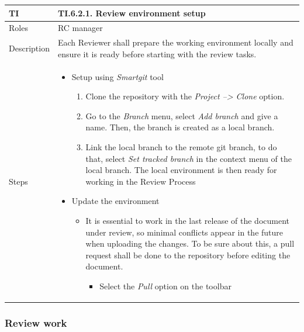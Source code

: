 \documentclass{template/openetcs_article}
\begin{document}
\begin{flushleft}
\tablefirsthead{}
\tablehead{}
\tabletail{}
\tablelasttail{}
\begin{supertabular}{|m{2cm}|m{13cm}|}
\hline
{}
TI & 
TI.6.2.1. Review environment setup
\\\hline
Roles &
RC manager
\\\hline
Description &
Each Reviewer shall prepare the working environment locally and ensure it is ready before starting with the review tasks.
\\\hline
Steps &
\begin{itemize}
\item Setup using {\it Smartgit} tool
\begin{enumerate}
\item Clone the repository with the {\it Project --> Clone} option.
\item Go to the {\it Branch} menu, select {\it Add branch} and give a name. Then, the branch is created as a local branch.
\item Link the local branch to the remote git branch, to do that, select {\it Set tracked branch} in the context menu of the local branch. The local environment is then ready for working in the Review Process
\end{enumerate}
\item Update the environment
\begin{itemize}
\item It is essential to work in the last release of the document under review, so minimal conflicts appear in the future when uploading the changes. To be sure about this, a pull request shall be done to the repository before editing the document.
\begin{itemize}
\item Select the {\it Pull} option on the toolbar
\end{itemize}
\end{itemize}
\end{itemize}
\\\hline
\end{supertabular}
\end{flushleft}

\subsubsection{Review work}
\end{document}
